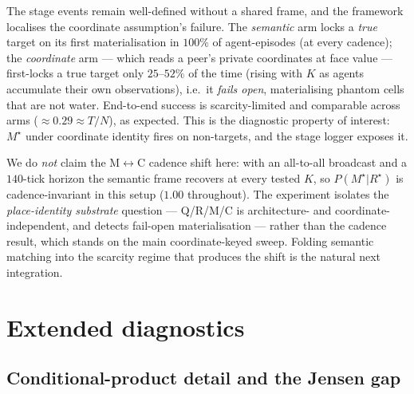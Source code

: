 \documentclass{article}
\begin{document}
The stage events remain well-defined without a shared frame, and the framework
localises the coordinate assumption's failure. The \emph{semantic} arm locks a
\emph{true} target on its first materialisation in $100\%$ of agent-episodes (at
every cadence); the \emph{coordinate} arm --- which reads a peer's private
coordinates at face value --- first-locks a true target only $25$--$52\%$ of the
time (rising with $K$ as agents accumulate their own observations), i.e.\ it
\emph{fails open}, materialising phantom cells that are not water. End-to-end
success is scarcity-limited and comparable across arms ($\approx0.29\!\approx\!T/N$),
as expected. This is the diagnostic property of interest: $M^\star$ under
coordinate identity fires on non-targets, and the stage logger exposes it.

We do \emph{not} claim the M$\leftrightarrow$C cadence shift here: with an
all-to-all broadcast and a $140$-tick horizon the semantic frame recovers at
every tested $K$, so $P(M^\star|R^\star)$ is cadence-invariant in this setup
($1.00$ throughout). The experiment isolates the \emph{place-identity substrate}
question --- Q/R/M/C is architecture- and coordinate-independent, and detects
fail-open materialisation --- rather than the cadence result, which stands on
the main coordinate-keyed sweep. Folding semantic matching into the scarcity
regime that produces the shift is the natural next integration.

\section{Extended diagnostics}
\label{app:diagnostics}

\subsection{Conditional-product detail and the Jensen gap}
\label{app:phi-detail}
\end{document}
